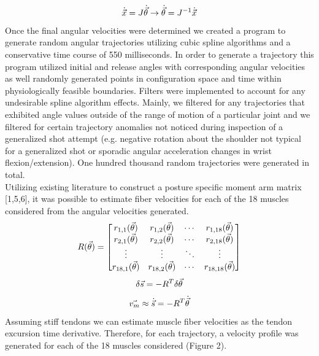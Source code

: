 \documentclass[12pt]{article}
\begin{document}
\begin{multicols}{2}
\begin{equation}
\centering \large
\dot{\vec{x}} = J\dot{\vec{\theta}} \rightarrow \dot{\vec{\theta}} = J^{-1}\dot{\vec{x}}
\end{equation}
Once the final angular velocities were determined we created a program to generate random angular trajectories utilizing cubic spline algorithms and a conservative time course of 550 milliseconds. In order to generate a trajectory this program utilized initial and release angles with corresponding angular velocities as well randomly generated points in configuration space and time within physiologically feasible boundaries. Filters were implemented to account for any undesirable spline algorithm effects. Mainly, we filtered for any trajectories that exhibited angle values outside of the range of motion of a particular joint and we filtered for certain trajectory anomalies not noticed during inspection of a generalized shot attempt (e.g. negative rotation about the shoulder not typical for a generalized shot or sporadic angular acceleration changes in wrist flexion/extension). One hundred thousand random trajectories were generated in total.\\
Utilizing existing literature to construct a posture specific moment arm matrix [1,5,6], it was possible to estimate fiber velocities for each of the 18 muscles considered from the angular velocities generated.
\begin{equation}
\centering
R(\vec{\theta}) 
=
\begin{bmatrix}
r_{1,1}(\vec{\theta}) & r_{1,2}(\vec{\theta}) & \dotsb & r_{1,18}(\vec{\theta}) \\
r_{2,1}(\vec{\theta}) & r_{2,2}(\vec{\theta}) & \dotsb & r_{2,18}(\vec{\theta}) \\
\vdots & \vdots & \ddots & \vdots \\
r_{18,1}(\vec{\theta}) & r_{18,2}(\vec{\theta}) & \dotsb & r_{18,18}(\vec{\theta}) \\
\end{bmatrix}
\end{equation}
\begin{equation}
\centering \large
\delta\vec{s}
=
-R^{T}\delta\vec{\theta}
\end{equation}
\begin{equation}
\centering \large
\vec{v_{m}} \approx \dot{\vec{s}}
=
-R^{T}\dot{\vec{\theta}}
\end{equation}
Assuming stiff tendons we can estimate muscle fiber velocities as the tendon excursion time derivative. Therefore, for each trajectory, a velocity profile was generated for each of the 18 muscles considered (Figure 2). 

\end{multicols}
\end{document}
